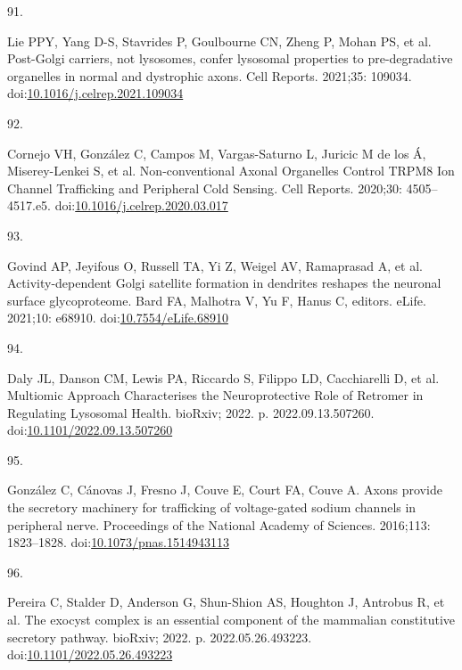 \documentclass[
  12pt,
  a4paper,
]{book}
\newlength{\cslhangindent}
\newlength{\csllabelwidth}
\newlength{\cslentryspacingunit} %
\newenvironment{CSLReferences}[2] %
 {%
  \setlength{\parindent}{0pt}
  \ifodd #1
  \let\oldpar\par
  \def\par{\hangindent=\cslhangindent\oldpar}
  \fi
  \setlength{\parskip}{#2\cslentryspacingunit}
 }%
 {}
\newcommand{\CSLLeftMargin}[1]{\parbox[t]{\csllabelwidth}{#1}}
\newcommand{\CSLRightInline}[1]{\parbox[t]{\linewidth - \csllabelwidth}{#1}\break}
\begin{document}
\begin{CSLReferences}{0}{0}
\leavevmode{}%
\CSLLeftMargin{91. }%
\CSLRightInline{Lie PPY, Yang D-S, Stavrides P, Goulbourne CN, Zheng P, Mohan PS, et al. Post-{Golgi} carriers, not lysosomes, confer lysosomal properties to pre-degradative organelles in normal and dystrophic axons. Cell Reports. 2021;35: 109034. doi:\href{https://doi.org/10.1016/j.celrep.2021.109034}{10.1016/j.celrep.2021.109034}}

\leavevmode{}%
\CSLLeftMargin{92. }%
\CSLRightInline{Cornejo VH, González C, Campos M, Vargas-Saturno L, Juricic M de los Á, Miserey-Lenkei S, et al. Non-conventional {Axonal Organelles Control TRPM8 Ion Channel Trafficking} and {Peripheral Cold Sensing}. Cell Reports. 2020;30: 4505--4517.e5. doi:\href{https://doi.org/10.1016/j.celrep.2020.03.017}{10.1016/j.celrep.2020.03.017}}

\leavevmode{}%
\CSLLeftMargin{93. }%
\CSLRightInline{Govind AP, Jeyifous O, Russell TA, Yi Z, Weigel AV, Ramaprasad A, et al. Activity-dependent {Golgi} satellite formation in dendrites reshapes the neuronal surface glycoproteome. Bard FA, Malhotra V, Yu F, Hanus C, editors. eLife. 2021;10: e68910. doi:\href{https://doi.org/10.7554/eLife.68910}{10.7554/eLife.68910}}

\leavevmode{}%
\CSLLeftMargin{94. }%
\CSLRightInline{Daly JL, Danson CM, Lewis PA, Riccardo S, Filippo LD, Cacchiarelli D, et al. Multiomic {Approach Characterises} the {Neuroprotective Role} of {Retromer} in {Regulating Lysosomal Health}. {bioRxiv}; 2022. p. 2022.09.13.507260. doi:\href{https://doi.org/10.1101/2022.09.13.507260}{10.1101/2022.09.13.507260}}

\leavevmode{}%
\CSLLeftMargin{95. }%
\CSLRightInline{González C, Cánovas J, Fresno J, Couve E, Court FA, Couve A. Axons provide the secretory machinery for trafficking of voltage-gated sodium channels in peripheral nerve. Proceedings of the National Academy of Sciences. 2016;113: 1823--1828. doi:\href{https://doi.org/10.1073/pnas.1514943113}{10.1073/pnas.1514943113}}

\leavevmode{}%
\CSLLeftMargin{96. }%
\CSLRightInline{Pereira C, Stalder D, Anderson G, Shun-Shion AS, Houghton J, Antrobus R, et al. The exocyst complex is an essential component of the mammalian constitutive secretory pathway. {bioRxiv}; 2022. p. 2022.05.26.493223. doi:\href{https://doi.org/10.1101/2022.05.26.493223}{10.1101/2022.05.26.493223}}


\end{CSLReferences}
\end{document}
